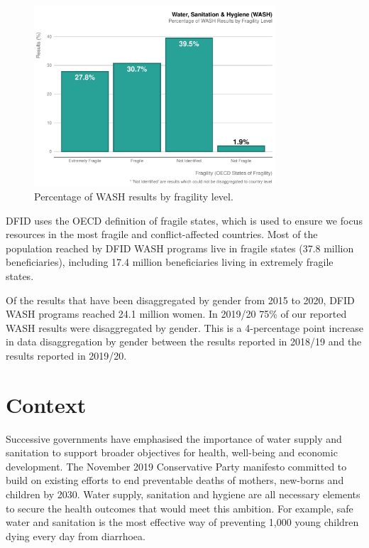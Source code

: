 \begin{figure}[htbp]
	\centering
	\includegraphics[width=0.8\textwidth]{../figs/wash_fragility_plot} \hfill
	\caption{Percentage of WASH results by fragility level.}
	\label{fig:wash_fragility_plot}
\end{figure}

DFID uses the OECD definition of fragile states, which is used to ensure we focus resources in the most fragile and conflict-affected countries. %
Most of the population reached by DFID WASH programs live in fragile states (37.8 million beneficiaries), including 17.4 million beneficiaries living in extremely fragile states. %

Of the results that have been disaggregated by gender from 2015 to 2020, DFID WASH programs reached 24.1 million women. %
In 2019/20 75\% of our reported WASH results were disaggregated by gender. %
This is a 4-percentage point increase in data disaggregation by gender between the results reported in 2018/19 and the results reported in 2019/20. %

\section{Context}
Successive governments have emphasised the importance of water supply and sanitation to support broader objectives for health, well-being and economic development. %
The November 2019 Conservative Party manifesto committed to build on existing efforts to end preventable deaths of mothers, new-borns and children  by 2030. %
Water supply, sanitation and hygiene are all necessary elements to secure the health outcomes that would meet this ambition. %
For example, safe water and sanitation is the most effective way of preventing 1,000 young children dying every day from diarrhoea. %

